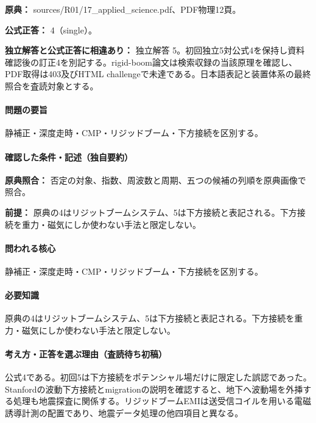 \noindent\textbf{原典：} sources/R01/17\_applied\_science.pdf、PDF物理12頁。

\textbf{公式正答：} 4（single）。

\par\textbf{独立解答と公式正答に相違あり：} 独立解答 5。初回独立5対公式4を保持し資料確認後の訂正4を別記する。rigid-boom論文は検索収録の当該原理を確認し、PDF取得は403及びHTML challengeで未達である。日本語表記と装置体系の最終照合を査読対象とする。

\paragraph{問題の要旨} 静補正・深度走時・CMP・リジッドブーム・下方接続を区別する。

\paragraph{確認した条件・記述（独自要約）}\mbox{}\par

\noindent\textbf{原典照合：} 否定の対象、指数、周波数と周期、五つの候補の列順を原典画像で照合。\par

\noindent\textbf{前提：} 原典の4はリジットブームシステム、5は下方接続と表記される。下方接続を重力・磁気にしか使わない手法と限定しない。\par

\paragraph{問われる核心} 静補正・深度走時・CMP・リジッドブーム・下方接続を区別する。

\paragraph{必要知識} 原典の4はリジットブームシステム、5は下方接続と表記される。下方接続を重力・磁気にしか使わない手法と限定しない。

\paragraph{考え方・正答を選ぶ理由（査読待ち初稿）} 公式4である。初回5は下方接続をポテンシャル場だけに限定した誤認であった。Stanfordの波動下方接続とmigrationの説明を確認すると、地下へ波動場を外挿する処理も地震探査に関係する。リジッドブームEMIは送受信コイルを用いる電磁誘導計測の配置であり、地震データ処理の他四項目と異なる。

